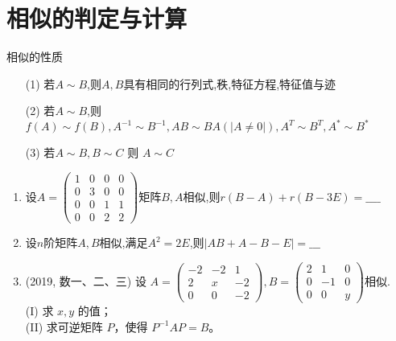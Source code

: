 \documentclass[12pt, a4paper, oneside, UTF8]{ctexbook}
\begin{document}
\section{相似的判定与计算}
\begin{remark}
    相似的性质
    \begin{enumerate}
        \item [(1)] 若$A\sim B$,则$A,B$具有相同的行列式,秩,特征方程,特征值与迹
        \item [(2)] 若$A\sim B$,则$f(A)\sim f(B),A^{-1}\sim B^{-1}, AB\sim BA(\left|A\neq 0\right|),A^{T}\sim B^{T},A^{*}\sim B^{*}$ 
        \item [(3)] 若$A\sim B, B\sim C$ 则 $A\sim C$
    \end{enumerate}
\end{remark}
\begin{enumerate}
    \item 设$A=\begin{pmatrix}
        1 & 0 & 0 & 0 \\
        0 & 3 & 0 & 0 \\
        0 & 0 & 1 & 1 \\
        0 & 0 & 2 & 2
    \end{pmatrix}$矩阵$B,A$相似,则$r(B-A)+r(B-3E)=\_\_\_\_$
    
    \begin{solution}
        \newpage
    \end{solution}

    \item 设$n$阶矩阵$A,B$相似,满足$A^2=2E$,则$\left|AB+A-B-E\right|=\_\_\_$
    
    \begin{solution}
        \newpage
    \end{solution}

    \item (2019, 数一、二、三) 设
    $
    A = \begin{pmatrix}
    -2 & -2 & 1 \\
    2 & x & -2 \\
    0 & 0 & -2
    \end{pmatrix},
    B = \begin{pmatrix}
    2 & 1 & 0 \\
    0 & -1 & 0 \\
    0 & 0 & y
    \end{pmatrix}
    $相似.\\
    (I) 求 $x, y$ 的值； \\
    (II) 求可逆矩阵 $P$，使得 $P^{-1}AP = B$。
    
    \begin{solution}
    \newpage
    \end{solution}
\end{enumerate}
\end{document}
